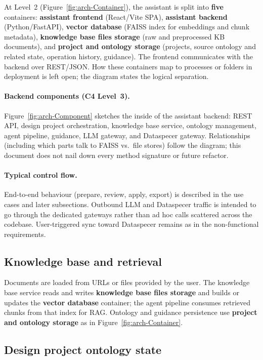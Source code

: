 \documentclass{article}
\begin{document}
At Level~2 (Figure~\ref{fig:arch-Container}), the assistant is split into \textbf{five} containers: \textbf{assistant frontend} (React/Vite SPA), \textbf{assistant backend} (Python/FastAPI), \textbf{vector database} (FAISS index for embeddings and chunk metadata), \textbf{knowledge base files storage} (raw and preprocessed KB documents), and \textbf{project and ontology storage} (projects, source ontology and related state, operation history, guidance). The frontend communicates with the backend over REST/JSON. How these containers map to processes or folders in deployment is left open; the diagram states the logical separation.

\paragraph{Backend components (C4 Level~3).}
Figure~\ref{fig:arch-Component} sketches the inside of the assistant backend: REST API, design project orchestration, knowledge base service, ontology management, agent pipeline, guidance, LLM gateway, and Dataspecer gateway. Relationships (including which parts talk to FAISS vs.\ file stores) follow the diagram; this document does not nail down every method signature or future refactor.

\paragraph{Typical control flow.}
End-to-end behaviour (prepare, review, apply, export) is described in the use cases and later subsections. Outbound LLM and Dataspecer traffic is intended to go through the dedicated gateways rather than ad hoc calls scattered across the codebase. User-triggered sync toward Dataspecer remains as in the non-functional requirements.

\subsection{Knowledge base and retrieval}
\label{sec:kb-retrieval}

Documents are loaded from URLs or files provided by the user. The knowledge base service reads and writes \textbf{knowledge base files storage} and builds or updates the \textbf{vector database} container; the agent pipeline consumes retrieved chunks from that index for RAG. Ontology and guidance persistence use \textbf{project and ontology storage} as in Figure~\ref{fig:arch-Container}.

\subsection{Design project ontology state}
\label{sec:ontology-state}
\end{document}
